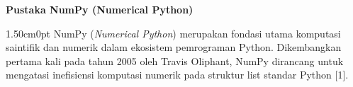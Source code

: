 \documentclass[12pt,a4paper]{article}
\begin{document}
{}
\noindent\hspace*{0.75cm}\textbf{\normalsize Pustaka NumPy (Numerical Python)}\par
\vspace{0.12cm}

\begin{adjustwidth}{1.50cm}{0pt}
\hspace*{0.85cm}NumPy (\textit{Numerical Python}) merupakan fondasi utama komputasi saintifik dan numerik dalam ekosistem pemrograman Python. Dikembangkan pertama kali pada tahun 2005 oleh Travis Oliphant, NumPy dirancang untuk mengatasi inefisiensi komputasi numerik pada struktur list standar Python [1].
\end{adjustwidth}
\end{document}
